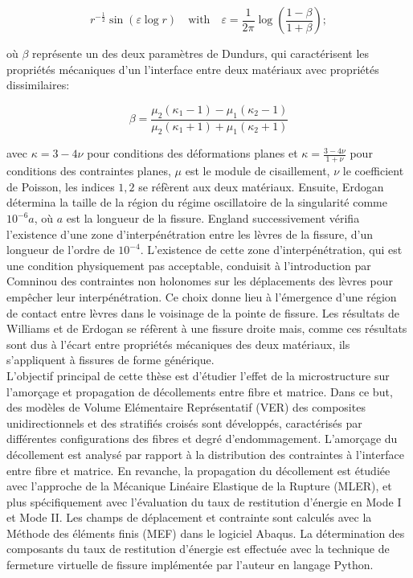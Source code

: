 \begin{equation}\label{resumefr:eq:singularitywilliams}
r^{-\frac{1}{2}}\sin\left(\varepsilon\log r\right)\quad\text{with}\quad\varepsilon=\frac{1}{2\pi}\log\left(\frac{1-\beta}{1+\beta}\right);
\end{equation}

o\`u $\beta$ repr\'esente un des deux param\`etres de Dundurs, qui caract\'erisent les propri\'et\'es m\'ecaniques d'un l'interface entre deux mat\'eriaux avec propri\'et\'es dissimilaires:

\begin{equation}\label{resumefr:eq:dundursbeta}
\beta=\frac{\mu_{2}\left(\kappa_{1}-1\right)-\mu_{1}\left(\kappa_{2}-1\right)}{\mu_{2}\left(\kappa_{1}+1\right)+\mu_{1}\left(\kappa_{2}+1\right)}
\end{equation}

avec $\kappa=3-4\nu$ pour conditions des d\'eformations planes et  $\kappa=\frac{3-4\nu}{1+\nu}$ pour conditions des contraintes planes, $\mu$ est le module de cisaillement, $\nu$ le coefficient de Poisson, les indices $1,2$ se r\'ef\`erent aux deux mat\'eriaux. Ensuite, Erdogan d\'etermina la taille de la r\'egion du r\'egime oscillatoire de la singularit\'e comme $10^{-6}a$, o\`u $a$ est la longueur de la fissure. England successivement v\'erifia l'existence d'une zone d'interp\'en\'etration entre les l\`evres de la fissure, d'un longueur de l'ordre de $10^{-4}$. L'existence de cette zone d'interp\'en\'etration, qui est une condition physiquement pas acceptable, conduisit \`a l'introduction par Comninou des contraintes non holonomes sur les d\'eplacements des l\`evres pour emp\^echer leur interp\'en\'etration. Ce choix donne lieu \`a l'\'emergence d'une r\'egion de contact entre l\`evres dans le voisinage de la pointe de fissure. Les r\'esultats de Williams et de Erdogan se r\'ef\`erent \`a une fissure droite mais, comme ces r\'esultats sont dus \`a l'\'ecart entre propri\'et\'es m\'ecaniques des deux mat\'eriaux, ils s'appliquent \`a fissures de forme g\'en\'erique.\\

L'objectif principal de cette th\`ese est d'\'etudier l'effet de la microstructure sur l'amor\c{c}age et propagation de d\'ecollements entre fibre et matrice. Dans ce but, des mod\`eles de Volume El\'ementaire Repr\'esentatif (VER) des composites unidirectionnels et des stratifi\'es crois\'es sont d\'evelopp\'es, caract\'eris\'es par diff\'erentes configurations des fibres et degr\'e d'endommagement. L'amor\c{c}age du d\'ecollement est analys\'e par rapport \`a la distribution des contraintes \`a l'interface entre fibre et matrice. En revanche, la propagation du d\'ecollement est \'etudi\'ee avec l'approche de la M\'ecanique Lin\'eaire Elastique de la Rupture (MLER), et plus sp\'ecifiquement avec l'\'evaluation du taux de restitution d'\'energie en Mode I et Mode II. Les champs de d\'eplacement et contrainte sont calcul\'es avec la M\'ethode des \'el\'ements finis (MEF) dans le logiciel Abaqus. La d\'etermination des composants du taux de restitution d'\'energie est effectu\'ee avec la technique de fermeture virtuelle de fissure impl\'ement\'ee par l'auteur en langage Python.\\

